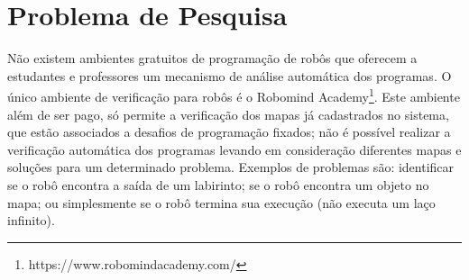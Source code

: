 

\section{Problema de Pesquisa}

Não existem ambientes gratuitos de programação de robôs que oferecem a estudantes e professores um mecanismo de análise automática dos programas. O único ambiente de verificação para robôs é o Robomind Academy\footnote[2]{https://www.robomindacademy.com/}. Este ambiente além de ser pago, só permite a verificação dos mapas já cadastrados no sistema, que estão associados a desafios de programação fixados; não é possível realizar a verificação automática dos programas levando em consideração diferentes mapas e soluções para um determinado problema. Exemplos de problemas são: identificar se o robô encontra a saída de um labirinto; se o robô encontra um objeto no mapa; ou simplesmente se o robô termina sua execução (não executa um laço infinito).




